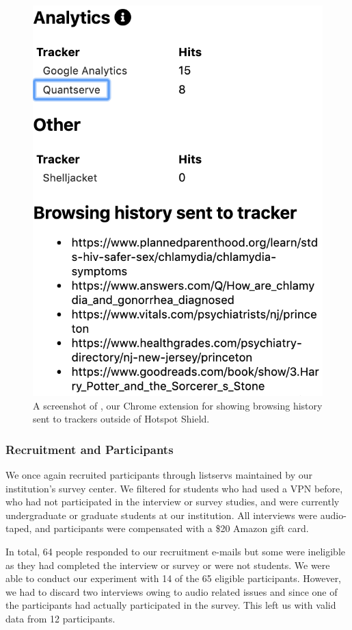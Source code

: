 \begin{figure}[t]
    \includegraphics[width=0.85\linewidth]{sections/figures/vpn-audit.png}
    \caption{A screenshot of \tool, our Chrome extension for showing browsing history sent to trackers outside of Hotspot Shield.}
    \label{fig:vpn-audit}
\end{figure}


\subsubsection{Recruitment and Participants} 

We once again recruited participants through listservs maintained by our
institution's survey center.  We filtered for students who had used a VPN
before, who had not participated in the interview or survey studies, and were
currently undergraduate or graduate students at our institution.  All
interviews were audio-taped, and participants were compensated with a \$20
Amazon gift card.

In total, 64 people responded to our recruitment e-mails but some were
ineligible as they had completed the interview or survey or were not students.
We were able to conduct our experiment with 14 of the 65 eligible
participants.  However, we had to discard two interviews owing to audio
related issues and since one of the participants had actually participated in
the survey.  This left us with valid data from 12 participants.


